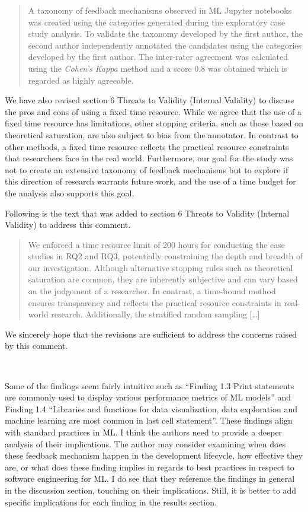 \documentclass[11pt,fleqn]{article}
\newcommand{\eline}{\vspace*{.75\baselineskip}}
\newcommand{\Referee}[1]{\eline \noindent {\bf Reviewer comment #1:} \\}
\newenvironment{revcomment}[1][]
{\Referee{#1}\begin{rcomment}}
{\end{rcomment}}
\begin{document}
\begin{quote}
  A taxonomy of feedback mechanisms observed in ML Jupyter notebooks was created using the categories generated during the exploratory case study analysis. To validate the taxonomy developed by the first author, the second author independently annotated the candidates using the categories developed by the first author. The inter-rater agreement was calculated using the \emph{Cohen's Kappa} method and a score 0.8 was obtained which is regarded as highly agreeable.
\end{quote}

We have also revised section 6 Threats to Validity (Internal Validity) to discuss the pros and cons of using a fixed time resource. While we agree that the use of a fixed time resource has limitations, other stopping criteria, such as those based on theoretical saturation, are also subject to bias from the annotator. In contrast to other methods, a fixed time resource reflects the practical resource constraints that researchers face in the real world. Furthermore, our goal for the study was not to create an extensive taxonomy of feedback mechanisms but to explore if this direction of research warrants future work, and the use of a time budget for the analysis also supports this goal. 

Following is the text that was added to section 6 Threats to Validity (Internal Validity) to address this comment.

\begin{quote}
  We enforced a time resource limit of 200 hours for conducting the case studies in RQ2 and RQ3, potentially constraining the depth and breadth of our investigation. Although alternative stopping rules such as theoretical saturation are common, they are inherently subjective and can vary based on the judgement of a researcher. In contrast, a time-bound method ensures transparency and reflects the practical resource constraints in real-world research. Additionally, the stratified random sampling [\ldots]
\end{quote}

We sincerely hope that the revisions are sufficient to address the concerns raised by this comment.

\begin{revcomment}[3.8]
  Some of the findings seem fairly intuitive such as ``Finding 1.3 Print statements are commonly used to display various performance metrics of ML models'' and Finding 1.4 ``Libraries and functions for data visualization, data exploration and machine learning are most common in last cell statement''. These findings align with standard practices in ML. I think the authors need to provide a deeper analysis of their implications. The author may consider examining when does these feedback mechanism happen in the development lifecycle, how effective they are, or what does these finding implies in regards to best practices in respect to software engineering for ML. I do see that they reference the findings in general in the discussion section, touching on their implications. Still, it is better to add specific implications for each finding in the results section.
\end{revcomment}
\end{document}

